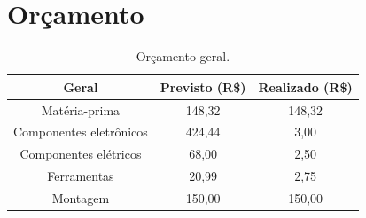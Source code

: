 

\chapter{Orçamento}

\begin{table}[htpb]
\begin{center}
\caption{Orçamento geral.}
\begin{tabular}{|c|c|c|}
\hline
\textbf{Geral}          & \textbf{Previsto (R\$)} & \textbf{Realizado (R\$)} \\ \hline
Matéria-prima           & 148,32                   & 148,32                     \\ \hline
Componentes eletrônicos & 424,44                  & 3,00                     \\ \hline
Componentes elétricos   & 68,00                    & 2,50                     \\ \hline
Ferramentas             & 20,99                    & 2,75                     \\ \hline
Montagem                & 150,00                    & 150,00                     \\ \hline
\end{tabular}
\end{center}
\end{table}

